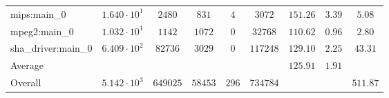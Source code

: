 \begin{tabular}{|l|c|c|c|c|c|c|c|c|}
mips:main\_0            & $ 1.640 \cdot 10^{1}  $ & $ 2480   $ & $ 831   $ & $ 4   $ & $ 3072   $ & $ 151.26      $ & $ 3.39    $ & $ 5.08    $ \\
mpeg2:main\_0           & $ 1.032 \cdot 10^{1}  $ & $ 1142   $ & $ 1072  $ & $ 0   $ & $ 32768  $ & $ 110.62      $ & $ 0.96    $ & $ 2.80    $ \\
sha\_driver:main\_0     & $ 6.409 \cdot 10^{2}  $ & $ 82736  $ & $ 3029  $ & $ 0   $ & $ 117248 $ & $ 129.10      $ & $ 2.25    $ & $ 43.31   $ \\
\hline
Average                 & $                     $ & $        $ & $       $ & $     $ & $        $ & $ 125.91      $ & $ 1.91    $ & $         $ \\
\hline
Overall                 & $ 5.142 \cdot 10^{3}  $ & $ 649025 $ & $ 58453 $ & $ 296 $ & $ 734784 $ & $             $ & $         $ & $ 511.87  $ \\
\hline
\end{tabular}
